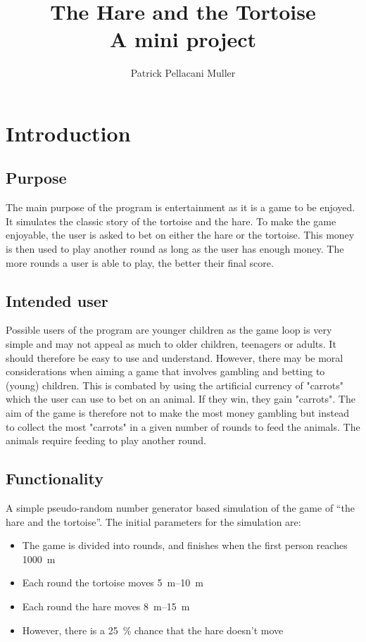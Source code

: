 \documentclass[11pt]{article}
\title{%
    The Hare and the Tortoise \\
    \large A mini project \\
}
\author{Patrick Pellacani Muller}
\date{\displaydate{writing_date}}
\begin{document}
\maketitle
\section{Introduction}
\subsection{Purpose}
The main purpose of the program is entertainment as it is a game to be enjoyed. It
simulates the classic story of the tortoise and the hare. To make the game enjoyable,
the user is asked to bet on either the hare or the tortoise. This money is then used
to play another round as long as the user has enough money. The more rounds a user
is able to play, the better their final score.
\subsection{Intended user}
Possible users of the program are younger children as the game loop is very simple and
may not appeal as much to older children, teenagers or adults. It should therefore be easy
to use and understand. However, there may be moral considerations when aiming a game that
involves gambling and betting to (young) children. This is combated by using the artificial
currency of "carrots" which the user can use to bet on an animal. If they win, they gain
"carrots". The aim of the game is therefore not to make the most money gambling but instead
to collect the most "carrots" in a given number of rounds to feed \cite{hare-diet,tortoise-diet}
the animals. The animals require feeding to play another round.
\subsection{Functionality}
A simple pseudo-random number generator based simulation of the game of ``the hare and the
tortoise''. The initial parameters for the simulation are:
\begin{itemize}
	\item The game is divided into rounds, and finishes when the first person reaches
	      \qty{1000}{\metre}
	\item Each round the tortoise moves \qtyrange{5}{10}{\metre}
	\item Each round the hare moves \qtyrange{8}{15}{\metre}
	\item However, there is a \qty{25}{\percent} chance that the hare doesn't move
\end{itemize}
\end{document}
